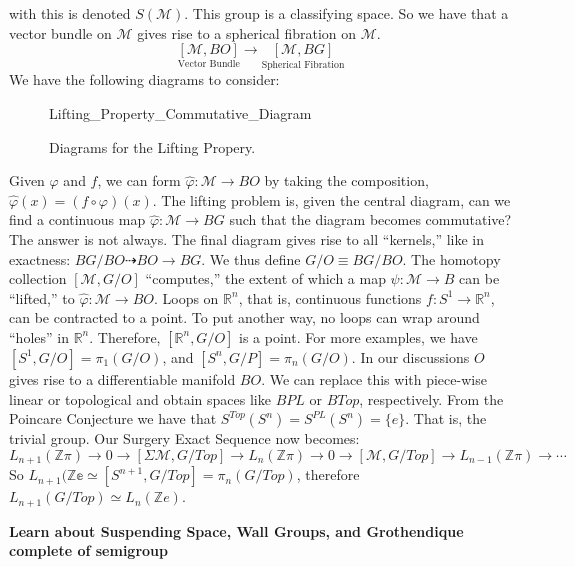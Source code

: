 \documentclass[crop=false,class=book,oneside]{standalone}
\begin{document}
        with this is denoted $S(\mathcal{M})$. This group
        is a classifying space. So we have that a vector
        bundle on $\mathcal{M}$ gives rise to a spherical
        fibration on $\mathcal{M}$.
        \begin{equation*}
            \underset{\textrm{Vector Bundle}}{[\mathcal{M},BO]}
            \longrightarrow
            \underset{\textrm{Spherical Fibration}}{[\mathcal{M},BG]}
        \end{equation*}
        We have the following diagrams to consider:
        \begin{figure}
            \centering
            \captionsetup{type=figure}
            
                      {Lifting_Property_Commutative_Diagram}
            \caption{Diagrams for the Lifting Propery.}
            \label{fig:Surgery_Theory_Lifting_Property_Diagram}
        \end{figure}
        Given $\varphi$ and $f$, we can form
        $\hat{\varphi}:\mathcal{M}\rightarrow{BO}$ by taking
        the composition, $\hat{\varphi}(x)=(f\circ\varphi)(x)$.
        The lifting problem is, given the central diagram,
        can we find a continuous map
        $\hat{\varphi}:\mathcal{M}\rightarrow{BG}$ such that
        the diagram becomes commutative? The answer is not always.
        The final diagram gives rise to all ``kernels,'' like
        in exactness: $BG/BO\dashrightarrow{BO}\rightarrow{BG}$.
        We thus define $G/O\equiv{BG/BO}$. The homotopy collection
        $[\mathcal{M},G/O]$ ``computes,'' the extent of which a map
        $\psi:\mathcal{M}\rightarrow{B}$ can be ``lifted,'' to
        $\hat{\varphi}:\mathcal{M}\rightarrow{BO}$.
        Loops on $\mathbb{R}^{n}$, that is, continuous functions
        $f:S^{1}\rightarrow\mathbb{R}^{n}$, can be
        contracted to a point. To put another way, no loops
        can wrap around ``holes'' in $\mathbb{R}^{n}$.
        Therefore, $[\mathbb{R}^{n},G/O]$ is a point. For
        more examples, we have
        $[S^{1},G/O]=\pi_{1}(G/O)$, and
        $[S^{n},G/P]=\pi_{n}(G/O)$. In our discussions
        $O$ gives rise to a differentiable manifold $BO$.
        We can replace this with piece-wise linear or
        topological and obtain spaces like
        $BPL$ or $BTop$, respectively.
        From the Poincare Conjecture we have that
        $S^{Top}(S^{n})=S^{PL}(S^{n})=\{e\}$. That is,
        the trivial group. Our Surgery Exact Sequence now
        becomes:
        \begin{equation*}
            L_{n+1}(\mathbb{Z}\pi)\rightarrow
            0\rightarrow
            [\Sigma\mathcal{M},G/Top]\rightarrow
            L_{n}(\mathbb{Z}\pi)\rightarrow
            0\rightarrow
            [\mathcal{M},G/Top]\rightarrow
            L_{n-1}(\mathbb{Z}\pi)\rightarrow\cdots
        \end{equation*}
        So $L_{n+1}(\mathbb{Ze}\simeq[S^{n+1},G/Top]%
            =\pi_{n}(G/Top)$,
        therefore $L_{n+1}(G/Top)\simeq{L_{n}(\mathbb{Z}e)}$.
        \par\hfill\par
        \textbf{Learn about Suspending Space, Wall Groups,
                and Grothendique complete of semigroup}
\end{document}
